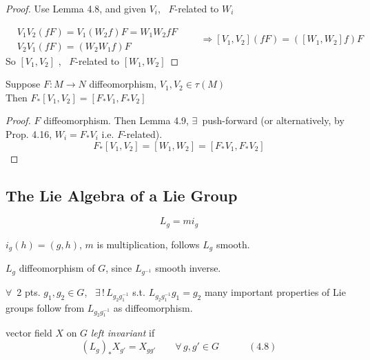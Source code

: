 \begin{proof}
Use Lemma 4.8, and given $V_i$, \, $F$-related to $W_i$  

\[
\begin{aligned}
  & V_1 V_2 (fF) = V_1 (W_2 f) F = W_1 W_2 fF \\ 
  & V_2 V_1 (fF) = (W_2 W_1 f) F
\end{aligned} \quad \quad \Longrightarrow [V_1, V_2](fF) = ( [W_1, W_2] f)F
\]
So $[V_1, V_2]$ , \, $F$-related to $[W_1, W_2]$
\end{proof}

\begin{corollary}[4.17]
  Suppose $F: M \to N$ diffeomorphism, $V_1, V_2 \in \tau(M)$ \\
Then $F_*[V_1, V_2] = [F_* V_1, F_* V_2 ]$

\end{corollary}

\begin{proof} $F$ diffeomorphism.  Then Lemma 4.9, $\exists \, $ push-forward (or alternatively, by Prop. 4.16, $W_i = F_* V_i$ i.e. $F$-related).  
\[
F_*[V_1, V_2 ] = [W_1, W_2 ] =  [F_* V_1, F_*V_2]
\]
\end{proof}

\subsection*{ The Lie Algebra of a Lie Group }

\[
L_g = m i_g 
\]


$i_g(h) = (g,h)$, $m$ is multiplication, follows $L_g$ smooth.  

$L_g$ diffeomorphism of $G$, since $L_{g^{-1}}$ smooth inverse. 

$\forall \, $ 2 pts. $g_1, g_2 \in G$, \, $\exists \, ! \, L_{g_2 g_1^{-1}}$ s.t. $L_{g_2 g_1^{-1}} g_1 = g_2$  many important properties of Lie groups follow from $L_{g_2 g_1^{-1}}$ as diffeomorphism.  

vector field $X$ on $G$ \emph{left invariant} if 
\begin{equation}
  (L_g)_* X_{g'} = X_{gg'} \quad \quad \forall \, g, g' \in G \quad \quad \quad (4.8)
\end{equation}

